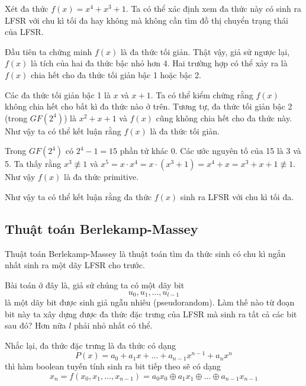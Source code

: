 \begin{example}
	Xét đa thức $f(x) = x^4 + x^3 + 1$. Ta có thể xác định xem đa thức này có sinh ra LFSR với chu kì tối đa hay không mà không cần tìm đồ thị chuyển trạng thái của LFSR.
	
	Đầu tiên ta chứng minh $f(x)$ là đa thức tối giản. Thật vậy, giả sử ngược lại, $f(x)$ là tích của hai đa thức bậc nhỏ hơn 4. Hai trường hợp có thể xảy ra là $f(x)$ chia hết cho đa thức tối giản bậc 1 hoặc bậc 2.
	
	Các đa thức tối giản bậc 1 là $x$ và $x+1$. Ta có thể kiểm chứng rằng $f(x)$ không chia hết cho bất kì đa thức nào ở trên. Tương tự, đa thức tối giản bậc 2 (trong $GF(2^4)$) là $x^2 + x + 1$ và $f(x)$ cũng không chia hết cho đa thức này. Như vậy ta có thể kết luận rằng $f(x)$ là đa thức tối giản.
	
	Trong $GF(2^4)$ có $2^4 - 1 = 15$ phần tử khác 0. Các ước nguyên tố của 15 là 3 và 5. Ta thấy rằng $x^3 \not\equiv 1$ và $x^5 = x \cdot x^4 = x \cdot (x^3 + 1) = x^4 + x = x^3 + x + 1 \not\equiv 1$. Như vậy $f(x)$ là đa thức primitive.
	
	Như vậy ta có thể kết luận rằng đa thức $f(x)$ sinh ra LFSR với chu kì tối đa.
\end{example}

\subsection*{Thuật toán Berlekamp-Massey}

Thuật toán Berlekamp-Massey là thuật toán tìm đa thức sinh có chu kì ngắn nhất sinh ra một dãy LFSR cho trước.

Bài toán ở đây là, giả sử chúng ta có một dãy bit
\begin{equation*}
	u_0, u_1, \ldots, u_{l-1}
\end{equation*}
là một dãy bit được sinh giả ngẫu nhiêu (pseudorandom). Làm thế nào từ đoạn bit này ta xây dựng được đa thức đặc trưng của LFSR mà sinh ra tất cả các bit sau đó? Hơn nữa $l$ phải nhỏ nhất có thể.

Nhắc lại, đa thức đặc trưng là đa thức có dạng
\begin{equation*}
	P(x) = a_0 + a_1 x + \ldots + a_{n-1} x^{n-1} + a_n x^n
\end{equation*}
thì hàm boolean tuyến tính sinh ra bit tiếp theo sẽ có dạng
\begin{equation*}
	x_n = f(x_0, x_1, \ldots, x_{n-1}) = a_0 x_0 \oplus a_1 x_1 \oplus \ldots \oplus a_{n-1} x_{n-1}
\end{equation*}

